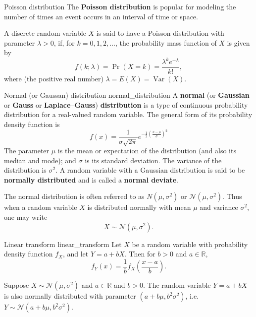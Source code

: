 \begin{definition}{Poisson distribution \cite{wikipedia_poisson_distribution}}{}
	The \textbf{Poisson distribution} is popular for modeling the number of times an event occurs in an interval of time or space.

	A discrete random variable $X$ is said to have a Poisson distribution with parameter $\lambda > 0$, if, for $k = 0, 1, 2, \ldots$, the probability mass function of $X$ is given by
	$$ f(k; \lambda) = \Pr(X = k)= \frac {\lambda^k e^{-\lambda}}{k!} , $$
	where (the positive real number) $\lambda = E(X) = \operatorname{Var}(X)$.
\end{definition}

\begin{definition}{Normal (or Gaussan) distribution \cite{}}{normal_distribution}
	A \textbf{normal} (or \textbf{Gaussian} or \textbf{Gauss} or \textbf{Laplace–Gauss}) \textbf{distribution} is a type of continuous probability distribution for a real-valued random variable. The general form of its probability density function is
	$$
		f(x) = \frac{1}{\sigma {\sqrt{2 \pi}}} 
		e^{-{\frac{1}{2}} \left( {\frac{x-\mu}{\sigma}} \right)^2}
	$$
	The parameter $\mu$ is the mean or expectation of the distribution (and also its median and mode); and $\sigma$ is its standard deviation. The variance of the distribution is $\sigma ^{2}$. A random variable with a Gaussian distribution is said to be \textbf{normally distributed} and is called a \textbf{normal deviate}.
\end{definition}

The normal distribution is often referred to as $N(\mu, \sigma^2)$ or $\mathcal{N}(\mu, \sigma^2)$. Thus when a random variable $X$ is distributed normally with mean $\mu$ and variance $\sigma^2$, one may write
$$ X \sim \mathcal{N}(\mu, \sigma^2) . $$

\begin{lemma}{Linear transform \cite{math2901_notes}}{linear_transform}
	Let $X$ be a random variable with probability density function $f_X$, and let $Y = a + bX$. Then for $b > 0$ and $a \in \mathbb{R}$,
	$$ f_Y(x) = \frac{1}{b} f_X \left( \frac{x - a}{b} \right) . $$
\end{lemma}

\begin{lemma}{\cite{math2901_notes}}{}
	Suppose $X \sim \mathcal{N}(\mu, \sigma^2)$ and $a \in \mathbb{R}$ and $b > 0$. The random variable $Y = a + bX$ is also normally distributed with parameter $(a + b \mu, b^2 \sigma^2)$, i.e. $Y \sim \mathcal{N}(a + b \mu, b^2 \sigma^2)$.
\end{lemma}

